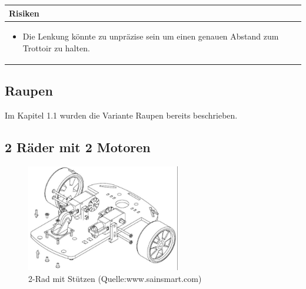 \begin{table}[h]
\begin{tabular}{p{}p{}}


 \textbf{Risiken} & \\ \hline
	 
\begin{itemize}
\item Die Lenkung könnte zu unpräzise sein um einen genauen Abstand zum Trottoir zu halten.
\end{itemize}


 
\end{tabular}
\end{table}

\pagebreak


\subsection{Raupen}
Im Kapitel 1.1 wurden die Variante Raupen bereits beschrieben.


\subsection{2 Räder mit 2 Motoren}

\begin{figure}[h!]%
\centering
\includegraphics[width=0.6\textwidth]{fig/3rad-3.JPG}
\caption{2-Rad mit Stützen (Quelle:www.sainsmart.com)}
\label{fig:2-Rad mit Stützen}
\end{figure}



